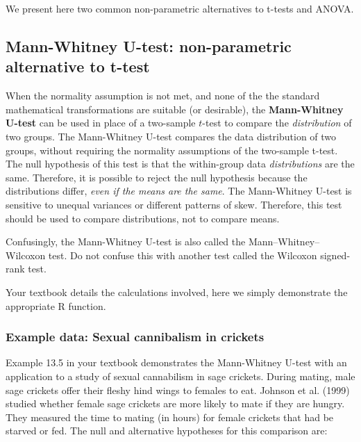 \documentclass[]{book}
\theoremstyle{definition}
\theoremstyle{definition}
\theoremstyle{definition}
\theoremstyle{remark}
\begin{document}
We present here two common non-parametric alternatives to t-tests and
ANOVA.

\hypertarget{mann-whitney-u-test-non-parametric-alternative-to-t-test}{%
\subsection{Mann-Whitney U-test: non-parametric alternative to
t-test}\label{mann-whitney-u-test-non-parametric-alternative-to-t-test}}

When the normality assumption is not met, and none of the the standard
mathematical transformations are suitable (or desirable), the
\textbf{Mann-Whitney U-test} can be used in place of a two-sample
\(t\)-test to compare the \emph{distribution} of two groups. The
Mann-Whitney U-test compares the data distribution of two groups,
without requiring the normality assumptions of the two-sample t-test.
The null hypothesis of this test is that the within-group data
\emph{distributions} are the same. Therefore, it is possible to reject
the null hypothesis because the distributions differ, \emph{even if the
means are the same}. The Mann-Whitney U-test is sensitive to unequal
variances or different patterns of skew. Therefore, this test should be
used to compare distributions, not to compare means.

Confusingly, the Mann-Whitney U-test is also called the
Mann--Whitney--Wilcoxon test. Do not confuse this with another test
called the Wilcoxon signed-rank test.

Your textbook details the calculations involved, here we simply
demonstrate the appropriate R function.

\hypertarget{example-data-sexual-cannibalism-in-crickets}{%
\subsubsection*{Example data: Sexual cannibalism in
crickets}\label{example-data-sexual-cannibalism-in-crickets}}

Example 13.5 in your textbook demonstrates the Mann-Whitney U-test with
an application to a study of sexual cannabilism in sage crickets. During
mating, male sage crickets offer their fleshy hind wings to females to
eat. Johnson et al. (1999) studied whether female sage crickets are more
likely to mate if they are hungry. They measured the time to mating (in
hours) for female crickets that had be starved or fed. The null and
alternative hypotheses for this comparison are:
\end{document}
